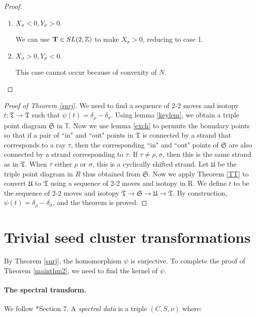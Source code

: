 \documentclass[11pt]{article} %
\theoremstyle{definition}
\newcommand{\Z}{{\mathbb Z}}
\newcommand{\T}{{\mathbb T}}
\newcommand{\ra}{\rightarrow}
\newcommand{\la}{\label}
\begin{document}
\begin{proof}
\begin{enumerate}
\item $X_\sigma<0,Y_\sigma>0$. 

We can use ${\bf T}\in SL(2,\Z)$ to make $X_\sigma>0$, reducing to case 1.\\

\item $X_\sigma>0,Y_\sigma<0$.

This case cannot occur because of convexity of $N$.
\end{enumerate}
 
\end{proof}

\begin{proof}[Proof of Theorem \ref{surj}]
We need to find a sequence of 2-2 moves and isotopy $t:\mathfrak T  \ra \mathfrak T$ such that $\psi(t)=\delta_{\rho}-\delta_{\sigma}$. Using lemma \ref{keylem}, we obtain a triple point diagram $\mathfrak S$ in $\T$. Now we use lemma \ref{exch} to permute the boundary points so that if a pair of ``in" and ``out" points in $\mathfrak T$ is connected by a strand that corresponds to a ray $\tau$, then the corresponding ``in" and ``out" points of $\mathfrak S$ are also connected by a strand corresponding to $\tau$. If $\tau \neq \rho, \sigma$, then this is the same strand as in $\mathfrak T$. When $\tau $ either $\rho$ or $\sigma$, this is a cyclically shifted strand. Let $\mathfrak U$ be the triple point diagram in $R$ thus obtained from $\mathfrak S$. Now we apply Theorem \ref{TT} to convert $\mathfrak U$ to $\mathfrak T$ using a sequence of 2-2 moves and isotopy in R. We define $t$ to be the sequence of 2-2 moves and isotopy $\mathfrak T \rightarrow \mathfrak S \ra \mathfrak U \ra \mathfrak T$. By construction, $\psi(t)=\delta_{\rho}-\delta_{\sigma}$, and the theorem is proved.




\end{proof}


\section{Trivial seed cluster transformations}\la{sec:tct}

By Theorem \ref{surj}, the homomorphism $\psi$ is surjective. To complete the proof of Theorem \ref{mainthm2}, we need to find the kernel of $\psi$. 

\paragraph{The spectral transform.}
We follow \cite{GK12}*{Section 7}.  A \textit{spectral data} is a triple $(C,S,\nu)$ where:
\end{document}
